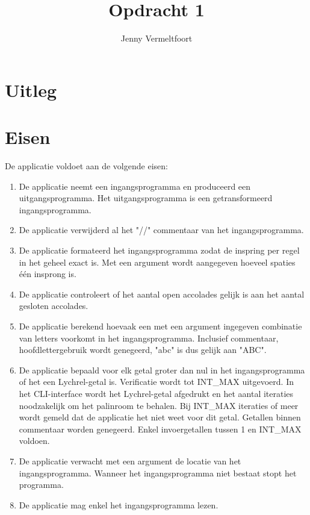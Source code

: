 \documentclass[10pt]{article}
\title{Opdracht 1}
\author{Jenny Vermeltfoort}
\begin{document}

\maketitle

\section{Uitleg}


\section{Eisen}
De applicatie voldoet aan de volgende eisen:
\begin{enumerate}
      \item De applicatie neemt een ingangsprogramma en produceerd een uitgangsprogramma. Het uitgangsprogramma is een
            getransformeerd ingangsprogramma.
      \item De applicatie verwijderd al het "//" commentaar van het ingangsprogramma.
      \item De applicatie formateerd het ingangsprogramma zodat de inspring per regel in het geheel exact is. Met een
            argument wordt aangegeven hoeveel spaties \'e\'en insprong is.
      \item De applicatie controleert of het aantal open accolades gelijk is aan het aantal gesloten accolades.
      \item De applicatie berekend hoevaak een met een argument ingegeven combinatie van letters voorkomt in het
            ingangsprogramma. Inclusief commentaar, hoofdlettergebruik wordt genegeerd, "abc" is dus gelijk aan
            "ABC".
      \item De applicatie bepaald voor elk getal groter dan nul in het ingangsprogramma of het een Lychrel-getal is. Verificatie
            wordt tot INT\_MAX uitgevoerd. In het CLI-interface wordt het Lychrel-getal afgedrukt en het aantal iteraties
            noodzakelijk om het palinroom te behalen. Bij INT\_MAX iteraties of meer wordt gemeld dat de applicatie het niet weet voor dit
            getal. Getallen binnen commentaar worden genegeerd. Enkel invoergetallen tussen 1 en INT\_MAX voldoen.
      \item De applicatie verwacht met een argument de locatie van het ingangsprogramma. Wanneer het ingangsprogramma
            niet bestaat stopt het programma.
      \item De applicatie mag enkel het ingangsprogramma lezen.

\end{enumerate}
\end{document}
